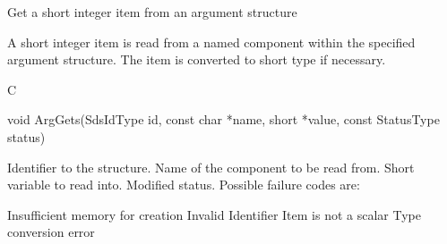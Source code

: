 \begin{manroutinedescription}
      Get a short integer item from an argument structure

      A short integer item is read from a named component within the
      specified argument structure. The item is converted to short
      type if necessary.
 
      C

      void ArgGets(SdsIdType id, const char *name, short *value, const %
StatusType {\mantt{*}} status)
 
\begin{manparametertable}
 Identifier to the structure.
 Name of the component to be read %
from.
  Short variable to read into.
 Modified status. Possible %
failure codes are:
\end{manparametertable}
\begin{mantwocolumntable}
Insufficient memory for creation
Invalid Identifier
Item is not a scalar
Type conversion error
\end{mantwocolumntable}
\end{manroutinedescription}

